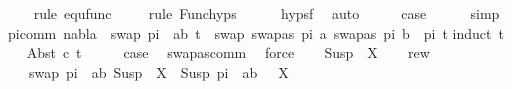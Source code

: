 \begin{isabellebody}
\ \ \ \ \isamarkupfalse%
{\isacharparenleft}{\kern0pt}rule\ equ{\isacharunderscore}{\kern0pt}func{\isacharparenright}{\kern0pt}\isanewline
\ \ \ \ \isamarkupfalse%
{\isacharparenleft}{\kern0pt}rule\ Func{\isachardot}{\kern0pt}hyps{\isacharparenright}{\kern0pt}\isanewline
\ \ \ \ \isamarkupfalse%
\ hypsf\ \isamarkupfalse%
\ auto\isanewline
\ \ \isamarkupfalse%
\ \isamarkupfalse%
\ {\isacharquery}{\kern0pt}case\isanewline
\ \ \ \ \isamarkupfalse%
\ simp\isanewline
{}\isamarkupfalse%
%
\endisatagproof
{\isafoldproof}%
%
\isadelimproof
\isanewline
%
\endisadelimproof
\isanewline
{}\isamarkupfalse%
\ pi{\isacharunderscore}{\kern0pt}comm{\isacharcolon}{\kern0pt}\ {\isachardoublequoteopen}nabla\ {\isasymturnstile}\ {\isacharparenleft}{\kern0pt}swap\ {\isacharparenleft}{\kern0pt}pi\ {\isacharat}{\kern0pt}\ {\isacharbrackleft}{\kern0pt}{\isacharparenleft}{\kern0pt}a{\isacharcomma}{\kern0pt}b{\isacharparenright}{\kern0pt}{\isacharbrackright}{\kern0pt}{\isacharparenright}{\kern0pt}\ t{\isacharparenright}{\kern0pt}\ {\isasymapprox}\ {\isacharparenleft}{\kern0pt}swap\ {\isacharparenleft}{\kern0pt}{\isacharbrackleft}{\kern0pt}{\isacharparenleft}{\kern0pt}swapas\ pi\ a{\isacharcomma}{\kern0pt}\ swapas\ pi\ b{\isacharparenright}{\kern0pt}{\isacharbrackright}{\kern0pt}\ {\isacharat}{\kern0pt}\ pi{\isacharparenright}{\kern0pt}\ t{\isacharparenright}{\kern0pt}{\isachardoublequoteclose}\isanewline
%
\isadelimproof
%
\endisadelimproof
%
\isatagproof
{}\isamarkupfalse%
{\isacharparenleft}{\kern0pt}induct\ t{\isacharparenright}{\kern0pt}\isanewline
\ \ \isamarkupfalse%
\ {\isacharparenleft}{\kern0pt}Abst\ c\ t{\isacharparenright}{\kern0pt}\isanewline
\ \ \isamarkupfalse%
\ \isamarkupfalse%
\ {\isacharquery}{\kern0pt}case\ \isamarkupfalse%
\ swapas{\isacharunderscore}{\kern0pt}comm\ \isamarkupfalse%
\ force\isanewline
{}\isamarkupfalse%
\isanewline
\ \ \isamarkupfalse%
\ {\isacharparenleft}{\kern0pt}Susp\ {\isasympi}{\isacharprime}{\kern0pt}\ X{\isacharparenright}{\kern0pt}\isanewline
\ \ \isamarkupfalse%
\ rew{}{\isacharcolon}{\kern0pt}\isanewline
\ \ \ \ {\isachardoublequoteopen}swap\ {\isacharparenleft}{\kern0pt}pi\ {\isacharat}{\kern0pt}\ {\isacharbrackleft}{\kern0pt}{\isacharparenleft}{\kern0pt}a{\isacharcomma}{\kern0pt}b{\isacharparenright}{\kern0pt}{\isacharbrackright}{\kern0pt}{\isacharparenright}{\kern0pt}\ {\isacharparenleft}{\kern0pt}Susp\ {\isasympi}{\isacharprime}{\kern0pt}\ X{\isacharparenright}{\kern0pt}\ {\isacharequal}{\kern0pt}\ Susp\ {\isacharparenleft}{\kern0pt}pi\ {\isacharat}{\kern0pt}\ {\isacharbrackleft}{\kern0pt}{\isacharparenleft}{\kern0pt}a{\isacharcomma}{\kern0pt}b{\isacharparenright}{\kern0pt}{\isacharbrackright}{\kern0pt}\ {\isacharat}{\kern0pt}\ {\isasympi}{\isacharprime}{\kern0pt}{\isacharparenright}{\kern0pt}\ X{\isachardoublequoteclose}\isanewline

\end{isabellebody}
